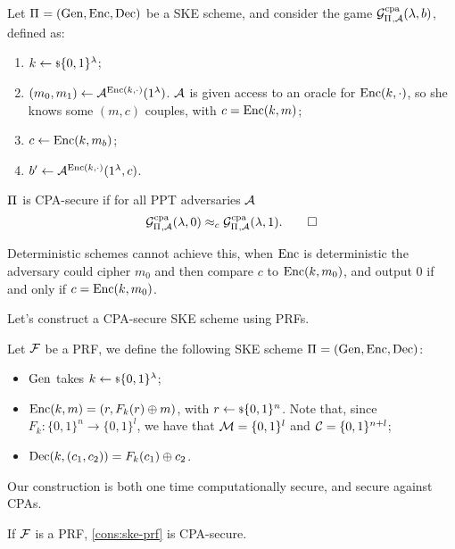\begin{definition}
	Let $\Pi_{} = \left( \mathrm{Gen} , \allowbreak \mathrm{Enc} , \allowbreak \mathrm{Dec} \right)$ be a \ac{SKE} scheme, and consider the game $\mathcal{G}^{\scriptstyle \text{cpa}}_{\Pi_{},\mathcal{A}}(\lambda, b)$, defined as:
	\begin{enumerate}
		\item $k \leftarrow {\scriptstyle \$} {\{0,1\}^{\lambda}}$;
		\item $(m_0, m_1) \leftarrow \mathcal{A}^{\mathrm{Enc}(k, \cdot)} (1^{\lambda})$.
			$\mathcal{A}$ is given access to an oracle for $\mathrm{Enc}(k, \cdot)$, so she knows some $(m,c)$ couples, with $c = \mathrm{Enc}(k, m)$;
		\item $c \leftarrow \mathrm{Enc}(k, m_b)$;
		\item $b' \leftarrow \mathcal{A}^{\mathrm{Enc}(k, \cdot)}(1^{\lambda}, c)$.
	\end{enumerate}

	$\Pi_{}$ is \ac{CPA}-secure if for all \ac{PPT} adversaries $\mathcal{A}$
	\begin{equation*}
		\mathcal{G}^{\scriptstyle \text{cpa}}_{\Pi_{},\mathcal{A}}(\lambda, 0) \approx_c \mathcal{G}^{\scriptstyle \text{cpa}}_{\Pi_{},\mathcal{A}}(\lambda, 1). \qedhere
	\end{equation*}
\end{definition}

Deterministic schemes cannot achieve this, \ie when $\mathrm{Enc}$ is deterministic the adversary could cipher $m_0$ and then compare $c$ to $\mathrm{Enc}(k, m_0)$, and output $0$ if and only if $c = \mathrm{Enc}(k, m_0)$.

Let's construct a \ac{CPA}-secure \ac{SKE} scheme using \acp{PRF}.
\begin{construction} \label{cons:ske-prf}
	Let $\mathcal{F}$ be a \ac{PRF}, we define the following \ac{SKE} scheme $\Pi_{} = \left( \mathrm{Gen} , \allowbreak \mathrm{Enc} , \allowbreak \mathrm{Dec} \right)$:
	\begin{itemize}
		\item $\mathrm{Gen}$ takes $k \leftarrow {\scriptstyle \$} {\{0,1\}^{\lambda}}$;
		\item $\mathrm{Enc}(k,m) = (r, F_k(r) \oplus m)$, with $r \leftarrow {\scriptstyle \$} {\{0,1\}^{n}}$.
			Note that, since $F_k : \{0,1\}^{n} \to \{0,1\}^{l}$, we have that $\mathcal{M} = \{0,1\}^{l}$ and $\mathcal{C} = \{0,1\}^{n+l}$;
		\item $\mathrm{Dec}(k, (c_1, c_2)) = F_k(c_1) \oplus c_2$. \qedhere
	\end{itemize}
\end{construction}

Our construction is both one time computationally secure, and secure against \acp{CPA}.
\begin{theorem} \label{thm:ske-prf-cpa}
	If $\mathcal{F}$ is a \ac{PRF}, \cref{cons:ske-prf} is \ac{CPA}-secure.
\end{theorem}

